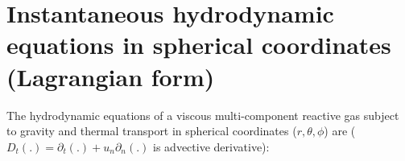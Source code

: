 \documentclass[10pt,paper=a4]{report}
\begin{document}
\newpage 

\section{Instantaneous hydrodynamic equations in spherical coordinates (Lagrangian form)}
\label{sect:hydro-inst-lag}

The hydrodynamic equations of a viscous multi-component reactive gas subject to gravity and thermal transport in spherical coordinates ($r, \theta, \phi$) are ($D_t (.) = \partial_t (.) + u_n \partial_n (.)$ is advective derivative):



\fontsize{9pt}{20pt}
\end{document}
